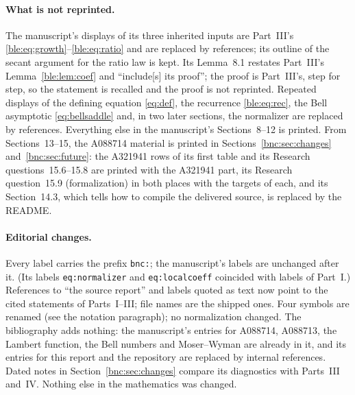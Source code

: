 \documentclass[11pt]{article}
\numberwithin{equation}{section}
\theoremstyle{definition}
\theoremstyle{remark}
\begin{document}
\paragraph{What is not reprinted.}
The manuscript's displays of its three inherited inputs are Part~III's
\eqref{ble:eq:growth}--\eqref{ble:eq:ratio} and are replaced by
references; its outline of the secant argument for the ratio law is kept.
Its Lemma~8.1 restates Part~III's Lemma~\ref{ble:lem:coef} and ``include[s]
its proof''; the proof is Part~III's, step for step, so the statement is
recalled and the proof is not reprinted. Repeated displays of the
defining equation \eqref{eq:def}, the recurrence \eqref{ble:eq:rec}, the
Bell asymptotic \eqref{eq:bellsaddle} and, in two later sections, the
normalizer are replaced by references. Everything else in the
manuscript's Sections~8--12 is printed. From Sections~13--15, the
A088714 material is printed in Sections~\ref{bnc:sec:changes}
and~\ref{bnc:sec:future}: the A321941 rows of its first table and its
Research questions~15.6--15.8 are printed with the A321941 part, its
Research question~15.9 (formalization) in both places with the targets of
each, and its Section~14.3, which tells how to compile the delivered
source, is replaced by the README.

\paragraph{Editorial changes.}
Every label carries the prefix \texttt{bnc:}; the manuscript's labels are
unchanged after it. (Its labels \texttt{eq:normalizer} and
\texttt{eq:localcoeff} coincided with labels of Part~I.) References to
``the source report'' and labels quoted as text now point to the cited
statements of Parts~I--III; file names are the shipped ones. Four symbols
are renamed (see the notation paragraph); no normalization changed. The
bibliography adds nothing: the manuscript's entries for A088714,
A088713, the Lambert function, the Bell numbers and Moser--Wyman are
already in it, and its entries for this report and the repository are
replaced by internal references. Dated notes in Section~\ref{bnc:sec:changes}
compare its diagnostics with Parts~III and~IV. Nothing else in the
mathematics was changed.
\end{document}
